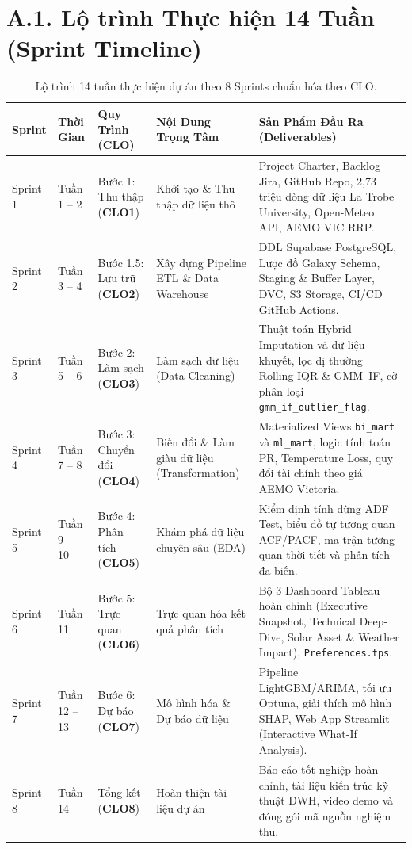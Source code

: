 \documentclass[12pt, a4paper]{report}
\begin{document}
\section*{A.1. Lộ trình Thực hiện 14 Tuần (Sprint Timeline)}
\begin{table}[H]
\centering
\small
\renewcommand{\arraystretch}{1}
\begin{tabularx}{\textwidth}{@{} l l p{3.2cm} p{3.8cm} X @{}}
\toprule
\textbf{Sprint} & \textbf{Thời Gian} & \textbf{Quy Trình (CLO)} & \textbf{Nội Dung Trọng Tâm} & \textbf{Sản Phẩm Đầu Ra (Deliverables)} \\
\midrule
Sprint 1 & Tuần 1 -- 2 & Bước 1: Thu thập \newline (\textbf{CLO1}) & Khởi tạo \& Thu thập dữ liệu thô & Project Charter, Backlog Jira, GitHub Repo, 2,73 triệu dòng dữ liệu La Trobe University, Open-Meteo API, AEMO VIC RRP. \\
Sprint 2 & Tuần 3 -- 4 & Bước 1.5: Lưu trữ \newline (\textbf{CLO2}) & Xây dựng Pipeline ETL \& Data Warehouse & DDL Supabase PostgreSQL, Lược đồ Galaxy Schema, Staging \& Buffer Layer, DVC, S3 Storage, CI/CD GitHub Actions. \\
Sprint 3 & Tuần 5 -- 6 & Bước 2: Làm sạch \newline (\textbf{CLO3}) & Làm sạch dữ liệu (Data Cleaning) & Thuật toán Hybrid Imputation vá dữ liệu khuyết, lọc dị thường Rolling IQR \& GMM--IF, cờ phân loại \texttt{gmm\_if\_outlier\_flag}. \\
Sprint 4 & Tuần 7 -- 8 & Bước 3: Chuyển đổi \newline (\textbf{CLO4}) & Biến đổi \& Làm giàu dữ liệu (Transformation) & Materialized Views \texttt{bi\_mart} và \texttt{ml\_mart}, logic tính toán PR, Temperature Loss, quy đổi tài chính theo giá AEMO Victoria. \\
Sprint 5 & Tuần 9 -- 10 & Bước 4: Phân tích \newline (\textbf{CLO5}) & Khám phá dữ liệu chuyên sâu (EDA) & Kiểm định tính dừng ADF Test, biểu đồ tự tương quan ACF/PACF, ma trận tương quan thời tiết và phân tích đa biến. \\
Sprint 6 & Tuần 11 & Bước 5: Trực quan \newline (\textbf{CLO6}) & Trực quan hóa kết quả phân tích & Bộ 3 Dashboard Tableau hoàn chỉnh (Executive Snapshot, Technical Deep-Dive, Solar Asset \& Weather Impact), \texttt{Preferences.tps}. \\
Sprint 7 & Tuần 12 -- 13 & Bước 6: Dự báo \newline (\textbf{CLO7}) & Mô hình hóa \& Dự báo dữ liệu & Pipeline LightGBM/ARIMA, tối ưu Optuna, giải thích mô hình SHAP, Web App Streamlit (Interactive What-If Analysis). \\
Sprint 8 & Tuần 14 & Tổng kết \newline (\textbf{CLO8}) & Hoàn thiện tài liệu dự án & Báo cáo tốt nghiệp hoàn chỉnh, tài liệu kiến trúc kỹ thuật DWH, video demo và đóng gói mã nguồn nghiệm thu. \\
\bottomrule
\end{tabularx}
\caption{Lộ trình 14 tuần thực hiện dự án theo 8 Sprints chuẩn hóa theo CLO.}
\label{tab:sprint_timeline}
\end{table}
\end{document}
